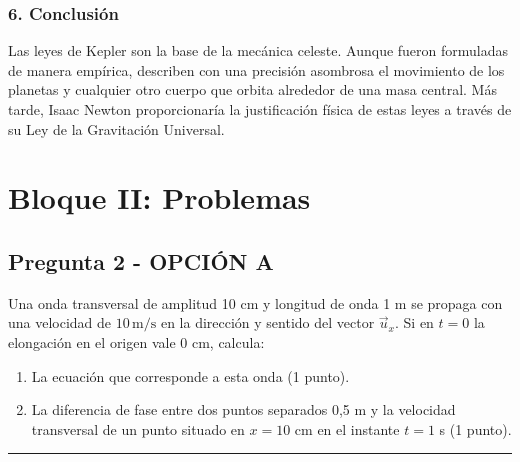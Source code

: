 \subsubsection*{6. Conclusión}
\begin{cajaconclusion}
Las leyes de Kepler son la base de la mecánica celeste. Aunque fueron formuladas de manera empírica, describen con una precisión asombrosa el movimiento de los planetas y cualquier otro cuerpo que orbita alrededor de una masa central. Más tarde, Isaac Newton proporcionaría la justificación física de estas leyes a través de su Ley de la Gravitación Universal.
\end{cajaconclusion}

\newpage

\section{Bloque II: Problemas}
\label{sec:ondas_2008_sep_ext}

\subsection{Pregunta 2 - OPCIÓN A}
\label{subsec:2A_2008_sep_ext}

\begin{cajaenunciado}
Una onda transversal de amplitud 10 cm y longitud de onda 1 m se propaga con una velocidad de $10\,\text{m/s}$ en la dirección y sentido del vector $\vec{u}_x$. Si en $t=0$ la elongación en el origen vale 0 cm, calcula:
\begin{enumerate}
    \item La ecuación que corresponde a esta onda (1 punto).
    \item La diferencia de fase entre dos puntos separados 0,5 m y la velocidad transversal de un punto situado en $x=10$ cm en el instante $t=1$ s (1 punto).
\end{enumerate}
\end{cajaenunciado}
\hrule

